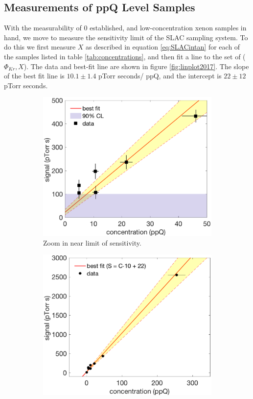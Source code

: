 \subsection{Measurements of ppQ Level Samples}
With the measurability of 0 established, and low-concentration xenon samples in hand, we move to measure the sensitivity limit of the SLAC sampling system. To do this we first measure $X$ as described in equation \ref{eq:SLACintan} for each of the samples listed in table \ref{tab:concentrations}, and then fit a line to the set of ($\Phi_{Kr},X$). The data and best-fit line are shown in figure \ref{fig:linplot2017}. The slope of the best fit line is $10.1 \pm 1.4$ pTorr seconds/ ppQ, and the intercept is $22 \pm 12$ pTorr seconds. 
\begin{figure}[h!]
\centering
\begin{subfigure}{0.5\textwidth}
  \centering
  \includegraphics[width=\textwidth]{Figures/SensPlot0217.eps}
  \caption{Zoom in near limit of sensitivity.}
\end{subfigure}%
\begin{subfigure}{0.5\textwidth}
  \centering
  \includegraphics[width=\textwidth]{Figures/LinPlot0217.eps}

\end{subfigure}
\end{figure}
